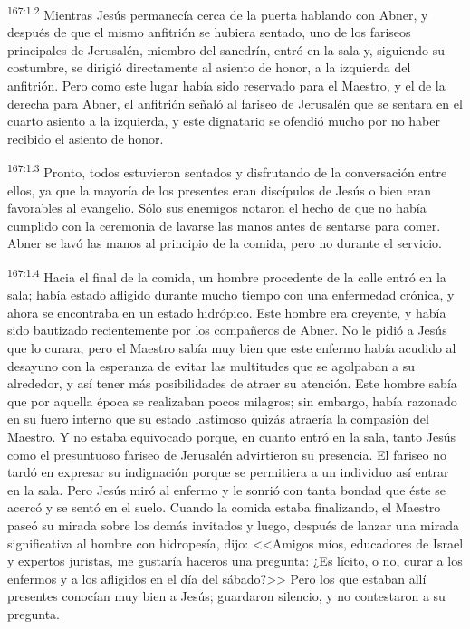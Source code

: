 \par 
\textsuperscript{167:1.2} Mientras Jesús permanecía cerca de la puerta hablando con Abner, y después de que el mismo anfitrión se hubiera sentado, uno de los fariseos principales de Jerusalén, miembro del sanedrín, entró en la sala y, siguiendo su costumbre, se dirigió directamente al asiento de honor, a la izquierda del anfitrión. Pero como este lugar había sido reservado para el Maestro, y el de la derecha para Abner, el anfitrión señaló al fariseo de Jerusalén que se sentara en el cuarto asiento a la izquierda, y este dignatario se ofendió mucho por no haber recibido el asiento de honor.

\par 
\textsuperscript{167:1.3} Pronto, todos estuvieron sentados y disfrutando de la conversación entre ellos, ya que la mayoría de los presentes eran discípulos de Jesús o bien eran favorables al evangelio. Sólo sus enemigos notaron el hecho de que no había cumplido con la ceremonia de lavarse las manos antes de sentarse para comer. Abner se lavó las manos al principio de la comida, pero no durante el servicio.

\par 
\textsuperscript{167:1.4} Hacia el final de la comida, un hombre procedente de la calle entró en la sala; había estado afligido durante mucho tiempo con una enfermedad crónica, y ahora se encontraba en un estado hidrópico. Este hombre era creyente, y había sido bautizado recientemente por los compañeros de Abner. No le pidió a Jesús que lo curara, pero el Maestro sabía muy bien que este enfermo había acudido al desayuno con la esperanza de evitar las multitudes que se agolpaban a su alrededor, y así tener más posibilidades de atraer su atención. Este hombre sabía que por aquella época se realizaban pocos milagros; sin embargo, había razonado en su fuero interno que su estado lastimoso quizás atraería la compasión del Maestro. Y no estaba equivocado porque, en cuanto entró en la sala, tanto Jesús como el presuntuoso fariseo de Jerusalén advirtieron su presencia. El fariseo no tardó en expresar su indignación porque se permitiera a un individuo así entrar en la sala. Pero Jesús miró al enfermo y le sonrió con tanta bondad que éste se acercó y se sentó en el suelo. Cuando la comida estaba finalizando, el Maestro paseó su mirada sobre los demás invitados y luego, después de lanzar una mirada significativa al hombre con hidropesía, dijo: <<Amigos míos, educadores de Israel y expertos juristas, me gustaría haceros una pregunta: ¿Es lícito, o no, curar a los enfermos y a los afligidos en el día del sábado?>> Pero los que estaban allí presentes conocían muy bien a Jesús; guardaron silencio, y no contestaron a su pregunta.


